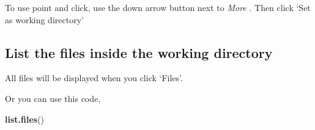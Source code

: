 \documentclass[]{book}
\newenvironment{Shaded}{\begin{snugshade}}{\end{snugshade}}
\newcommand{\KeywordTok}[1]{\textcolor[rgb]{0.13,0.29,0.53}{\textbf{#1}}}
\newcommand{\NormalTok}[1]{#1}
\theoremstyle{definition}
\theoremstyle{definition}
\theoremstyle{remark}
\begin{document}
To use point and click, use the down arrow button next to \emph{More} .
Then click `Set as working directory'

\subsection{List the files inside the working
directory}\label{list-the-files-inside-the-working-directory}

All files will be displayed when you click `Files'.

Or you can use this code,

\begin{Shaded}
\begin{Highlighting}[]
\KeywordTok{list.files}\NormalTok{()}
\end{Highlighting}
\end{Shaded}
\end{document}
